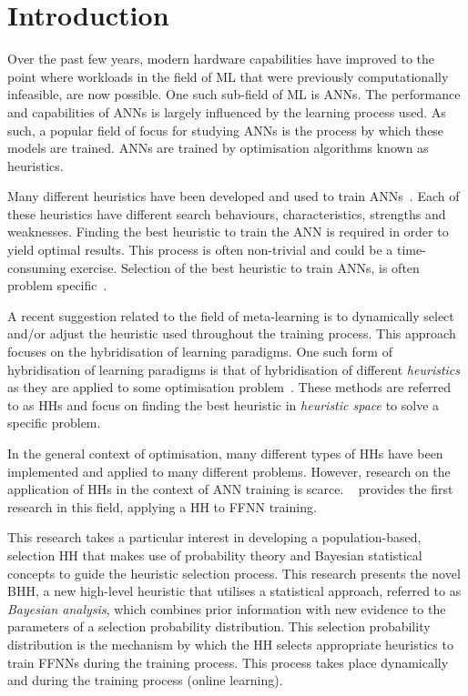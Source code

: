 \section{Introduction}
\label{sec:introduction}

Over the past few years, modern hardware capabilities have improved to the point where workloads in the field of \acs{ML} that were previously computationally infeasible, are now possible. One such sub-field of \acs{ML} is \acp{ANN}. The performance and capabilities of \acp{ANN} is largely influenced by the learning process used. As such, a popular field of focus for studying \acp{ANN} is the process by which these models are trained. \acp{ANN} are trained by optimisation algorithms known as heuristics.

Many different heuristics have been developed and used to train \acp{ANN}~\cite{ref:gudise:2003, ref:rakitianskaia:2012, ref:montana:1989}. Each of these heuristics have different search behaviours, characteristics, strengths and weaknesses. Finding the best heuristic to train the \acs{ANN} is required in order to yield optimal results. This process is often non-trivial and could be a time-consuming exercise.  Selection of the best heuristic to train \acp{ANN}, is often problem specific~\cite{ref:allen:1996, ref:drake:2020, ref:pillay:2018}.

A recent suggestion related to the field of meta-learning is to dynamically select and/or adjust the heuristic used throughout the training process. This approach focuses on the hybridisation of learning paradigms. One such form of hybridisation of learning paradigms is that of hybridisation of different \textit{heuristics} as they are applied to some optimisation problem~\cite{ref:burke:2013}. These methods are referred to as \acfp{HH} and focus on finding the best heuristic in \textit{heuristic space} to solve a specific problem.

In the general context of optimisation, many different types of \acp{HH} have been implemented and applied to many different problems. However, research on the application of \acp{HH} in the context of \acs{ANN} training is scarce. \citeauthor{ref:nel:2021}~\cite{ref:nel:2021} provides the first research in this field, applying a \acs{HH} to \acs{FFNN} training.

This research takes a particular interest in developing a population-based, selection \acs{HH} that makes use of probability theory and Bayesian statistical concepts to guide the heuristic selection process. This research presents the novel \Acf{BHH}, a new high-level heuristic that utilises a statistical approach, referred to as \textit{Bayesian analysis}, which combines prior information with new evidence to the parameters of a selection probability distribution. This selection probability distribution is the mechanism by which the \acs{HH} selects appropriate heuristics to train \acp{FFNN} during the training process. This process takes place dynamically and during the training process (online learning).


